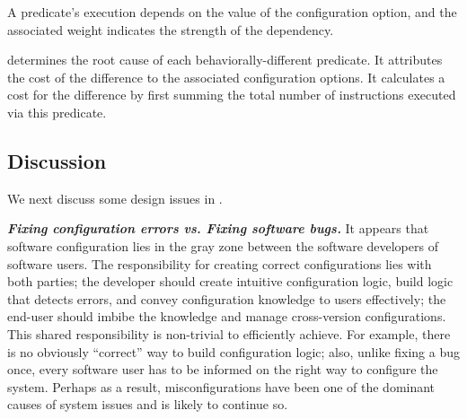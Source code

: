 




A predicate's execution depends on the value of
the configuration option, and the associated weight
indicates the strength of the dependency.



\ourtool determines the root cause of each behaviorally-different
predicate.  It attributes the cost of the difference 
to the associated configuration options.
It calculates a cost for the difference by first summing
the total number of instructions executed via this
predicate. 




\subsection{Discussion}

We next discuss some design issues in \ourtool.

\vspace{1mm}

\noindent \textbf{\textit{Fixing configuration errors vs. Fixing software bugs.}}
It appears that software configuration lies in the gray zone between
the software developers of software users.
The responsibility for creating correct configurations
lies with both parties; the developer should create
intuitive configuration logic, build logic that detects
errors, and convey configuration knowledge to users
effectively;  the end-user should imbibe the
knowledge and manage cross-version configurations.
This shared responsibility is non-trivial to efficiently
achieve. For example, there is no obviously ``correct'' way to
build configuration logic; also, unlike fixing a bug once,
every software user has to be informed on the right way to
configure the system. Perhaps as a result, misconfigurations
have been one of the dominant causes of system issues and
is likely to continue so.

